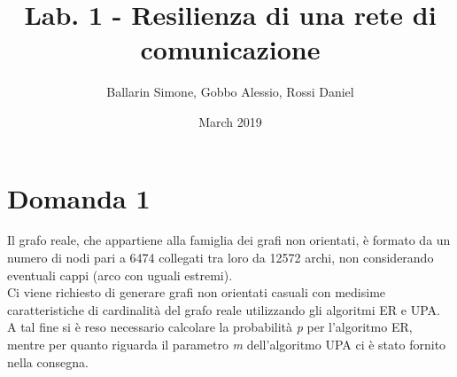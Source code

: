 \documentclass{article}
\title{Lab. 1 - Resilienza di una rete di comunicazione}
\author{Ballarin Simone, Gobbo Alessio, Rossi Daniel}
\date{March 2019}
\begin{document}
\maketitle

\section*{Domanda 1}
Il grafo reale, che appartiene alla famiglia dei grafi non orientati, è formato da un numero di nodi pari a 6474 collegati tra loro da 12572 archi, non considerando eventuali cappi (arco con uguali estremi).\\
Ci viene richiesto di generare grafi non orientati casuali con medisime caratteristiche di cardinalità del grafo reale utilizzando gli algoritmi ER e UPA.\\
A tal fine si è reso necessario calcolare la probabilità \textit{p} per l'algoritmo ER, mentre per quanto riguarda il parametro \textit{m} dell'algoritmo UPA ci è stato fornito nella consegna.
\end{document}
